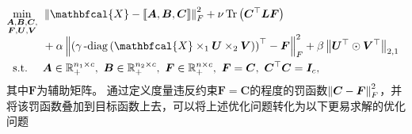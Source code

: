 \begin{equation*}\label{eq:cpufs-equiv}
    \begin{aligned}
    & \underset{\smash[b]{\substack{\mathclap{\boldsymbol{A},\boldsymbol{B},\boldsymbol{C},}\\\mathclap{\boldsymbol{F},\boldsymbol{U},\boldsymbol{V}}}}}{\min}
    & &  \norm{\mathbfcal{X}-\left\llbracket \boldsymbol{A}, \boldsymbol{B}, \boldsymbol{C} \right\rrbracket}_{F}^{2} + \nu\operatorname{Tr}\left(\boldsymbol{C}^{\top}\boldsymbol{L}\boldsymbol{F}\right) \\ \span&& + \alpha\norm{\left(\mydiag\left(\mathbfcal{X}\times_{1}\boldsymbol{U}\times_{2}\boldsymbol{V}\right)\right)^{\top} - \boldsymbol{F}}_{F}^{2} + \beta \norm{\boldsymbol{U}^{\top}\odot\boldsymbol{V}^{\top}}_{2,1}\\
    & \text{s.t.}
    & & \boldsymbol{A}\in \mathbb{R}_{+}^{n_1 \times c},~\boldsymbol{B}\in \mathbb{R}_{+}^{n_2 \times c},~\boldsymbol{F}\in \mathbb{R}_{+}^{n \times c},~\boldsymbol{F}=\boldsymbol{C},~\boldsymbol{C}^{\top}\boldsymbol{C} = \boldsymbol{I}_{c},
    \end{aligned}
\end{equation*}
其中$\boldsymbol{F}$为辅助矩阵。
通过定义度量违反约束$\boldsymbol{F}=\boldsymbol{C}$的程度的罚函数$\left\lVert\boldsymbol{C}-\boldsymbol{F}\right\rVert_{F}^{2}$，并将该罚函数叠加到目标函数上去，可以将上述优化问题转化为以下更易求解的优化问题
